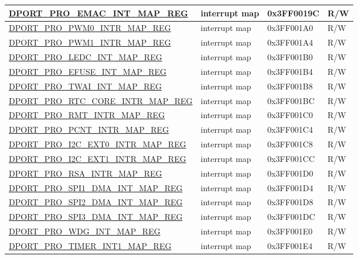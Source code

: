 \begin{longtable}{ |L{8.2cm} | L{4.5cm} | l | l | }
\hyperref[regdesc:PROEMACINTMAPREG]{DPORT\_PRO\_EMAC\_INT\_MAP\_REG} & interrupt map & 0x3FF0019C & R/W \\ \hline
\hyperref[regdesc:PROPWM0INTRMAPREG]{DPORT\_PRO\_PWM0\_INTR\_MAP\_REG} & interrupt map & 0x3FF001A0 & R/W \\ \hline
\hyperref[regdesc:PROPWM1INTRMAPREG]{DPORT\_PRO\_PWM1\_INTR\_MAP\_REG} & interrupt map & 0x3FF001A4 & R/W \\ \hline
\hyperref[regdesc:PROLEDCINTMAPREG]{DPORT\_PRO\_LEDC\_INT\_MAP\_REG} & interrupt map & 0x3FF001B0 & R/W \\ \hline
\hyperref[regdesc:PROEFUSEINTMAPREG]{DPORT\_PRO\_EFUSE\_INT\_MAP\_REG} & interrupt map & 0x3FF001B4 & R/W \\ \hline
\hyperref[regdesc:PROCANINTMAPREG]{DPORT\_PRO\_TWAI\_INT\_MAP\_REG} & interrupt map & 0x3FF001B8 & R/W \\ \hline
\hyperref[regdesc:PRORTCCOREINTRMAPREG]{DPORT\_PRO\_RTC\_CORE\_INTR\_MAP\_REG} & interrupt map & 0x3FF001BC & R/W \\ \hline
\hyperref[regdesc:PRORMTINTRMAPREG]{DPORT\_PRO\_RMT\_INTR\_MAP\_REG} & interrupt map & 0x3FF001C0 & R/W \\ \hline
\hyperref[regdesc:PROPCNTINTRMAPREG]{DPORT\_PRO\_PCNT\_INTR\_MAP\_REG} & interrupt map & 0x3FF001C4 & R/W \\ \hline
\hyperref[regdesc:PROI2CEXT0INTRMAPREG]{DPORT\_PRO\_I2C\_EXT0\_INTR\_MAP\_REG} & interrupt map & 0x3FF001C8 & R/W \\ \hline
\hyperref[regdesc:PROI2CEXT1INTRMAPREG]{DPORT\_PRO\_I2C\_EXT1\_INTR\_MAP\_REG} & interrupt map & 0x3FF001CC & R/W \\ \hline
\hyperref[regdesc:PRORSAINTRMAPREG]{DPORT\_PRO\_RSA\_INTR\_MAP\_REG} & interrupt map & 0x3FF001D0 & R/W \\ \hline
\hyperref[regdesc:PROSPI1DMAINTMAPREG]{DPORT\_PRO\_SPI1\_DMA\_INT\_MAP\_REG} & interrupt map & 0x3FF001D4 & R/W \\ \hline
\hyperref[regdesc:PROSPI2DMAINTMAPREG]{DPORT\_PRO\_SPI2\_DMA\_INT\_MAP\_REG} & interrupt map & 0x3FF001D8 & R/W \\ \hline
\hyperref[regdesc:PROSPI3DMAINTMAPREG]{DPORT\_PRO\_SPI3\_DMA\_INT\_MAP\_REG} & interrupt map & 0x3FF001DC & R/W \\ \hline
\hyperref[regdesc:PROWDGINTMAPREG]{DPORT\_PRO\_WDG\_INT\_MAP\_REG} & interrupt map & 0x3FF001E0 & R/W \\ \hline
\hyperref[regdesc:PROTIMERINT1MAPREG]{DPORT\_PRO\_TIMER\_INT1\_MAP\_REG} & interrupt map & 0x3FF001E4 & R/W \\ \hline

\end{longtable}
